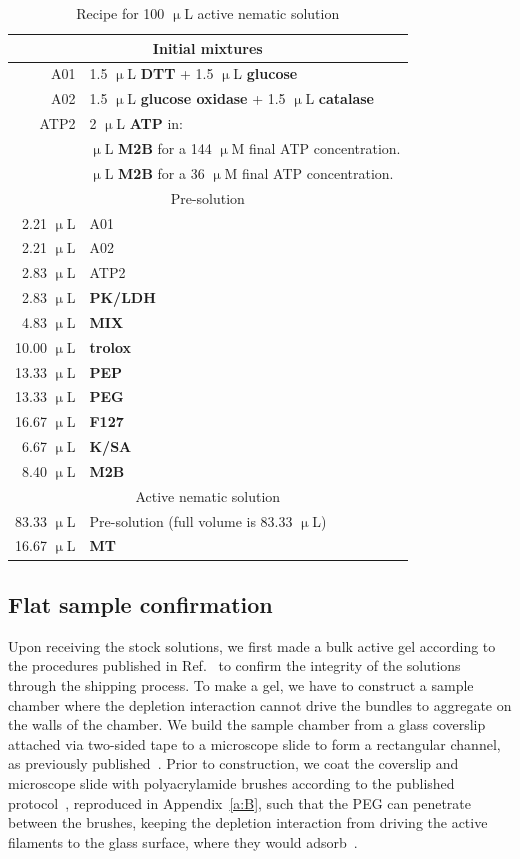 \begin{table}[ht]
  \centering
  \caption{Recipe for 100 $\upmu$L active nematic solution}
  \begin{tabular}{|r l|}
    \hline
    \multicolumn{2}{|c|}{Initial mixtures}\\
    \hline
    A01 & 1.5 $\upmu$L {\bf DTT} + 1.5 $\upmu$L {\bf glucose} \\
    A02 & 1.5 $\upmu$L {\bf glucose oxidase} + 1.5 $\upmu$L {\bf catalase} \\
    ATP2 & 2 $\upmu$L {\bf ATP} in:\\
    & \quad 18 $\upmu$L {\bf M2B} for a 144 $\upmu$M final ATP concentration.\\
    & \quad 38 $\upmu$L {\bf M2B} for a 36 $\upmu$M final ATP concentration.\\
    \hline
    \multicolumn{2}{|c|}{Pre-solution}\\
    \hline
    2.21 $\upmu$L & A01\\
    2.21 $\upmu$L & A02\\
    2.83 $\upmu$L & ATP2\\
    2.83 $\upmu$L & {\bf PK/LDH} \\
    4.83 $\upmu$L & {\bf MIX}\\
    10.00 $\upmu$L & {\bf trolox}\\
    13.33 $\upmu$L & {\bf PEP}\\
    13.33 $\upmu$L & {\bf PEG}\\
    16.67 $\upmu$L & {\bf F127}\\
    6.67 $\upmu$L & {\bf K/SA}\\
    8.40 $\upmu$L & {\bf M2B}\\
    \hline
    \multicolumn{2}{|c|}{Active nematic solution}\\
    \hline
    83.33 $\upmu$L & Pre-solution (full volume is 83.33 $\upmu$L)\\
    16.67 $\upmu$L & {\bf MT}\\
    \hline
  \end{tabular}
  \label{t:3-recipe}
\end{table}


\subsection{Flat sample confirmation}
Upon receiving the stock solutions, we first made a bulk active gel according to the procedures published in Ref.~\cite{RN3} to confirm the integrity of the solutions through the shipping process.
To make a gel, we have to construct a sample chamber where the depletion interaction cannot drive the bundles to aggregate on the walls of the chamber.
We build the sample chamber from a glass coverslip attached via two-sided tape to a microscope slide to form a rectangular channel, as previously published~\cite{RN3}.
Prior to construction, we coat the coverslip and microscope slide with polyacrylamide brushes according to the published protocol~\cite{RN3}, reproduced in Appendix~\ref{a:B}, such that the PEG can penetrate between the brushes, keeping the depletion interaction from driving the active filaments to the glass surface, where they would adsorb~\cite{RN3}.

